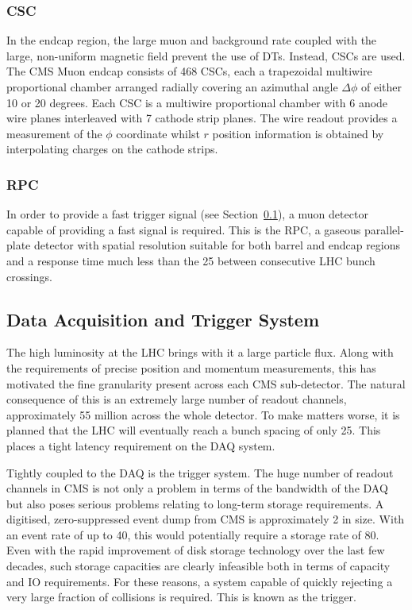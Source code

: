 \subsubsection{\acl{CSC}}
In the endcap region, the large muon and background rate coupled with the large,
non-uniform magnetic field prevent the use of \ac{DT}s. Instead, \acl{CSC}s are
used. The CMS Muon endcap consists of 468 \ac{CSC}s, each a trapezoidal
multiwire proportional chamber arranged radially covering an azimuthal angle
$\Delta\phi$ of either 10 or 20 degrees. Each \ac{CSC} is a multiwire
proportional chamber with 6 anode wire planes interleaved with 7 cathode strip
planes. The wire readout provides a measurement of the $\phi$ coordinate whilst
$r$ position information is obtained by interpolating charges on the cathode
strips.

\subsubsection{\acl{RPC}}
In order to provide a fast trigger signal (see Section~\ref{sec:trigger}), a
muon detector capable of providing a fast signal is required. This is the
\acl{RPC}, a gaseous parallel-plate detector with spatial resolution suitable
for both barrel and endcap regions and a response time much less than the
\unit{25}{\nano\second} between consecutive \ac{LHC} bunch crossings.

\subsection{Data Acquisition and Trigger System}
\label{sec:trigger}
The high luminosity at the \ac{LHC} brings with it a large particle flux. Along
with the requirements of precise position and momentum measurements, this has
motivated the fine granularity present across each \ac{CMS} sub-detector. The
natural consequence of this is an extremely large number of readout channels,
approximately 55 million across the whole detector. To make matters
worse, it is planned that the \ac{LHC} will eventually reach a bunch spacing of
only \unit{25}{\nano\second}. This places a tight latency requirement on the
\ac{DAQ} system.

Tightly coupled to the \ac{DAQ} is the trigger system. The huge number of
readout channels in \ac{CMS} is not only a problem in terms of the bandwidth of
the \ac{DAQ} but also poses serious problems relating to long-term storage
requirements. A digitised, zero-suppressed event dump from \ac{CMS} is
approximately \unit{2}{\mega\byte} in size. With an event rate of up to
\unit{40}{\mega\hertz}, this would potentially require a storage rate of
\unit{80}{\tera\byte\per\second}. Even with the rapid improvement of disk
storage technology over the last few decades, such storage capacities are
clearly infeasible both in terms of capacity and \ac{IO} requirements. For these
reasons, a system capable of quickly rejecting a very large fraction of
collisions is required. This is known as the trigger.

